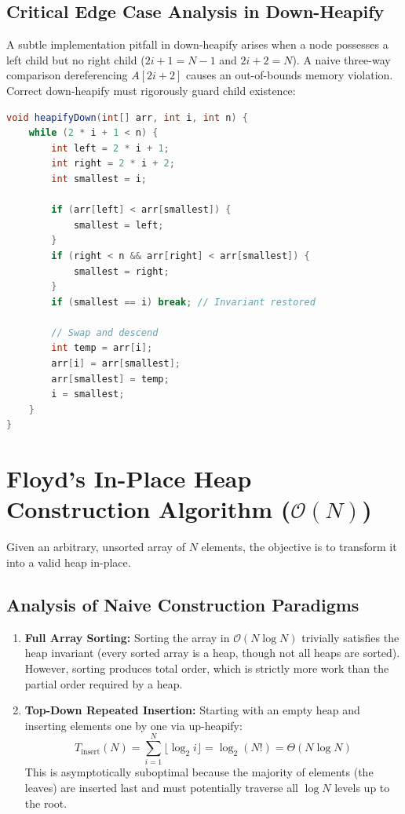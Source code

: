 \documentclass[10pt,twocolumn,letterpaper]{article}
\begin{document}
\subsection{Critical Edge Case Analysis in Down-Heapify}
A subtle implementation pitfall in down-heapify arises when a node possesses a left child but no right child ($2i + 1 = N - 1$ and $2i + 2 = N$). A naive three-way comparison dereferencing $A[2i+2]$ causes an out-of-bounds memory violation. Correct down-heapify must rigorously guard child existence:
\begin{lstlisting}[language=Java,caption={Robust Down-Heapify Implementation}]
void heapifyDown(int[] arr, int i, int n) {
    while (2 * i + 1 < n) {
        int left = 2 * i + 1;
        int right = 2 * i + 2;
        int smallest = i;

        if (arr[left] < arr[smallest]) {
            smallest = left;
        }
        if (right < n && arr[right] < arr[smallest]) {
            smallest = right;
        }
        if (smallest == i) break; // Invariant restored

        // Swap and descend
        int temp = arr[i];
        arr[i] = arr[smallest];
        arr[smallest] = temp;
        i = smallest;
    }
}
\end{lstlisting}

\section{Floyd's In-Place Heap Construction Algorithm ($\mathcal{O}(N)$)}
\label{sec:floyd}

Given an arbitrary, unsorted array of $N$ elements, the objective is to transform it into a valid heap in-place.

\subsection{Analysis of Naive Construction Paradigms}
\begin{enumerate}
    \item \textbf{Full Array Sorting:} Sorting the array in $\mathcal{O}(N \log N)$ trivially satisfies the heap invariant (every sorted array is a heap, though not all heaps are sorted). However, sorting produces total order, which is strictly more work than the partial order required by a heap.
    \item \textbf{Top-Down Repeated Insertion:} Starting with an empty heap and inserting elements one by one via up-heapify:
    \begin{equation}
    T_{\text{insert}}(N) = \sum_{i=1}^N \lfloor \log_2 i \rfloor = \log_2(N!) = \Theta(N \log N)
    \end{equation}
    This is asymptotically suboptimal because the majority of elements (the leaves) are inserted last and must potentially traverse all $\log N$ levels up to the root.
\end{enumerate}
\end{document}

